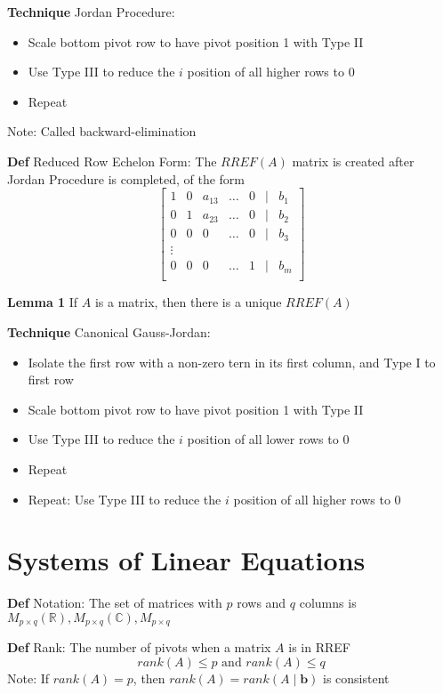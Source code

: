\documentclass[11pt,notitlepage]{report}
\newcommand{\bb}[1]{\ensuremath{\mathbb{#1}}}
\newcommand{\tbf}[1]{\textbf{#1}}
\begin{document}
\textbf{Technique} Jordan Procedure: 
\begin{itemize}
    \item Scale bottom pivot row to have pivot position 1 with Type II
    \item Use Type III to reduce the $i$ position of all higher rows to 0
    \item Repeat
\end{itemize}
\hspace*{5mm} Note: Called backward-elimination

\textbf{Def} Reduced Row Echelon Form: The $RREF(A)$ matrix is created after Jordan Procedure is completed, of the form
$$\begin{bmatrix}
1 & 0 & a_{13} & \dots & 0 & \mid &b_1\\
0 & 1 & a_{23} & \dots & 0 & \mid &b_2\\
0 & 0 & 0 & \dots & 0 & \mid &b_3\\
\vdots\\
0 & 0 & 0 & \dots & 1 & \mid &b_m\\
\end{bmatrix}$$

\textbf{Lemma 1} If $A$ is a matrix, then there is a unique $RREF(A)$


\textbf{Technique} Canonical  Gauss-Jordan: 
\begin{itemize}
    \item Isolate the first row with a non-zero tern in its first column, and Type I to first row
    \item Scale bottom pivot row to have pivot position 1 with Type II
    \item Use Type III to reduce the $i$ position of all lower rows to 0
    \item Repeat
    \item Repeat: Use Type III to reduce the $i$ position of all higher rows to 0
\end{itemize}

\newpage

\section{Systems of Linear Equations}

\textbf{Def} Notation: The set of matrices with $p$ rows and $q$ columns is $M_{p \times q}(\bb R), M_{p \times q}(\bb C), M_{p \times q} $

\textbf{Def} Rank: The number of pivots when a matrix $A$ is in RREF
$$rank(A) \leq p \text{ and } rank(A) \leq q$$
\hspace*{5mm} Note: If $rank(A) = p$, then $rank(A) = rank(A\mid \tbf b)$ is consistent
\end{document}
